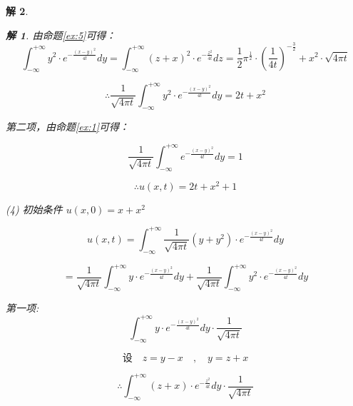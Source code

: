 \documentclass[12pt,a4paper]{article}
\newtheorem*{solution}{解}
\begin{document}
\begin{solution}
\begin{solution}
由命题\eqref{ex:5}可得：
\begin{equation*}
	\int_{-\infty}^{+\infty} y^2 \cdot e^{-\frac{(x-y)^2}{4t}} dy	=\int_{-\infty}^{+\infty}(z+x)^2 \cdot e^{-\frac{z^2}{4t}} dz=\frac{1}{2}\pi^{\frac{1}{2}}\cdot\left(\frac{1}{4t}\right)^{-\frac{3}{2}} +x^2 \cdot \sqrt{4\pi t}
\end{equation*}

\begin{equation*}
	\therefore \frac{1}{\sqrt{4\pi t}}\int_{-\infty}^{+\infty} y^2 \cdot e^{-\frac{(x-y)^2}{4t}} dy=2t+x^2
\end{equation*}

第二项，由命题\eqref{ex:1}可得：

\begin{equation*}
	\frac{1}{\sqrt{4\pi t}}\int_{-\infty}^{+\infty} e^{-\frac{(x-y)^2}{4t}} dy=1
\end{equation*}
	
	\begin{equation*}
		\therefore u(x,t) = 2t + x^2 + 1
	\end{equation*}
	
	
	
\end{solution}
	
	
(4) 初始条件 \( u(x,0) = x + x^2 \)
	
\begin{equation*}
 u(x,t) = \int_{-\infty}^{+\infty} \frac{1}{\sqrt{4\pi t}} (y + y^2) \cdot e^{-\frac{(x-y)^2}{4t}} dy
\end{equation*}

\begin{equation*}
	= \frac{1}{\sqrt{4\pi t}} \int_{-\infty}^{+\infty} y \cdot e^{-\frac{(x-y)^2}{4t}} dy + \frac{1}{\sqrt{4\pi t}} \int_{-\infty}^{+\infty} y^2 \cdot e^{-\frac{(x-y)^2}{4t}} dy
\end{equation*}

第一项:
\begin{equation*}
	\int_{-\infty}^{+\infty} y \cdot e^{-\frac{(x-y)^2}{4t}} dy \cdot \frac{1}{\sqrt{4\pi t}}
\end{equation*}

\begin{equation*}
	\text{设} \quad z = y - x \quad , \quad y = z + x
\end{equation*}

\begin{equation*}
	\therefore \int_{-\infty}^{+\infty} (z + x) \cdot e^{-\frac{z^2}{4t}} dy \cdot \frac{1}{\sqrt{4\pi t}}
\end{equation*}


\end{solution}
\end{document}
